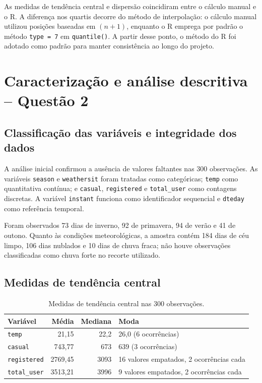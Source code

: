 \documentclass[12pt,oneside,a4paper,english,brazil]{abntex2}
\begin{document}
As medidas de tendência central e dispersão coincidiram entre o cálculo manual e o R. A diferença nos quartis decorre do método de interpolação: o cálculo manual utilizou posições baseadas em $(n+1)$, enquanto o R emprega por padrão o método \texttt{type = 7} em \texttt{quantile()}. A partir desse ponto, o método do R foi adotado como padrão para manter consistência ao longo do projeto.

\chapter{Caracterização e análise descritiva -- Questão 2}

\section{Classificação das variáveis e integridade dos dados}

A análise inicial confirmou a ausência de valores faltantes nas 300 observações. As variáveis \texttt{season} e \texttt{weathersit} foram tratadas como categóricas; \texttt{temp} como quantitativa contínua; e \texttt{casual}, \texttt{registered} e \texttt{total\_user} como contagens discretas. A variável \texttt{instant} funciona como identificador sequencial e \texttt{dteday} como referência temporal.

Foram observados 73 dias de inverno, 92 de primavera, 94 de verão e 41 de outono. Quanto às condições meteorológicas, a amostra contém 184 dias de céu limpo, 106 dias nublados e 10 dias de chuva fraca; não houve observações classificadas como chuva forte no recorte utilizado.

\section{Medidas de tendência central}

\begin{table}[H]
\centering
\caption{Medidas de tendência central nas 300 observações.}
\begin{tabular}{lrrp{5.2cm}}
\toprule
\rowcolor{lilasclaro}
\textbf{Variável} & \textbf{Média} & \textbf{Mediana} & \textbf{Moda} \\
\midrule
\texttt{temp} & 21,15 & 22,2 & 26,0 (6 ocorrências) \\
\texttt{casual} & 743,77 & 673 & 639 (3 ocorrências) \\
\texttt{registered} & 2769,45 & 3093 & 16 valores empatados, 2 ocorrências cada \\
\texttt{total\_user} & 3513,21 & 3996 & 9 valores empatados, 2 ocorrências cada \\
\bottomrule
\end{tabular}
\end{table}
\end{document}
